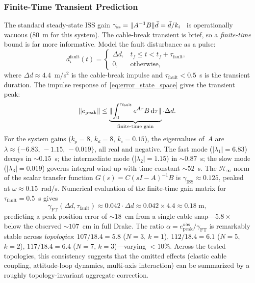 \subsubsection{Finite-Time Transient Prediction}

The standard steady-state ISS gain $\gamma_{\mathrm{ss}} = \lVert A^{-1}B \rVert\bar{d} = \bar{d}/k_i$~\cite{sontag2008iss} is operationally vacuous ($80$~m for this system). The cable-break transient is brief, so a \emph{finite-time} bound is far more informative. Model the fault disturbance as a pulse:
\begin{equation}\label{eq:pulse_model}
  d_i^{\mathrm{fault}}(t) = \begin{cases}
    \Delta d, & t_f \leq t < t_f + \tau_{\mathrm{fault}}, \\
    0, & \text{otherwise},
  \end{cases}
\end{equation}
where $\Delta d \approx 4.4$~m/s$^2$ is the cable-break impulse and $\tau_{\mathrm{fault}} < 0.5$~s is the transient duration. The impulse response of~\eqref{eq:error_state_space} gives the transient peak:
\begin{equation}\label{eq:tracking_bound}
  \lVert e_{\mathrm{peak}} \rVert \leq \underbrace{\lVert \int_0^{\tau_{\mathrm{fault}}} e^{A\tau} B\,\mathrm{d}\tau \rVert}_{\text{finite-time gain}} \cdot \Delta d.
\end{equation}
For the system gains ($k_p{=}8$, $k_d{=}8$, $k_i{=}0.15$), the eigenvalues of~$A$ are $\lambda \approx \{-6.83,\, -1.15,\, -0.019\}$, all real and negative. The fast mode ($|\lambda_1| = 6.83$) decays in ${\sim}0.15$~s; the intermediate mode ($|\lambda_2| = 1.15$) in ${\sim}0.87$~s; the slow mode ($|\lambda_3| = 0.019$) governs integral wind-up with time constant ${\sim}52$~s. The $\mathcal{H}_\infty$ norm of the scalar transfer function $G(s) = C(sI{-}A)^{-1}B$ is $\gamma_{\mathrm{ISS}} \approx 0.125$, peaked at $\omega \approx 0.15$~rad/s. Numerical evaluation of the finite-time gain matrix for $\tau_{\mathrm{fault}} = 0.5$~s gives
\begin{equation}\label{eq:gamma1_explicit}
  \gamma_{\mathrm{FT}}(\Delta d, \tau_{\mathrm{fault}}) \approx 0.042 \cdot \Delta d \approx 0.042 \times 4.4 \approx 0.18\;\text{m},
\end{equation}
predicting a peak position error of ${\sim}18$~cm from a single cable snap---$5.8\times$ below the observed ${\sim}107$~cm in full Drake. The ratio $\alpha = e_{\mathrm{peak}}^{\mathrm{obs}} / \gamma_{\mathrm{FT}}$ is remarkably stable across \emph{topologies}: $107/18.4 = 5.8$ ($N{=}3$, $k{=}1$), $112/18.4 = 6.1$ ($N{=}5$, $k{=}2$), $117/18.4 = 6.4$ ($N{=}7$, $k{=}3$)---varying $<10\%$. Across the tested topologies, this consistency suggests that the omitted effects (elastic cable coupling, attitude-loop dynamics, multi-axis interaction) can be summarized by a roughly topology-invariant aggregate correction.

